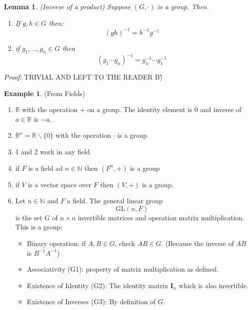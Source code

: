 \documentclass{report}
\newtheorem{lemma}[theorem]{Lemma}
\theoremstyle{remark}
\theoremstyle{definition}
\theoremstyle{definition}
\newtheorem{example}[theorem]{Example}
\theoremstyle{theorem}
\renewcommand{\v}[1]{\mathbf{#1}}
\begin{document}
\begin{lemma}
\emph{(Inverse of a product)} Suppose $(G,\cdot)$ is a group. Then
\begin{enumerate}[label=\textcircled{\tiny{\arabic*}}]
    \item If $g,h \in G$ then:
    \[(gh)^{-1}=h^{-1}g^{-1}\]
    \item if $g_1, ..., g_n \in G$ then
    \[(g_1 \cdots g_n)^{-1}=g_n^{-1}\cdots g_1^{-1}\]
\end{enumerate}
\end{lemma}
\emph{Proof:} TRIVIAL AND LEFT TO THE READER B\^)
\begin{example}
(From Fields)
\begin{enumerate}[label=\textcircled{\tiny{\arabic*}}]
    \item $\mathbb{R}$ with the operation + on a group. The identity element is 0 and inverse of $a \in \mathbb{R}$ is $-a$.
    \item $\mathbb{R}^x = \mathbb{R} \backslash \{0\}$ with the operation $\cdot$ is a group
    \item \textcircled{\tiny{1}} and \textcircled{\tiny{2}} work in any field
    \item if $F$ is a field ad $n \in \mathbb{N}$ then $(F^n, +)$ is a group
    \item if $V$ is a vector space over $F$ then $(V,+)$ is a group.
    \item Let $n \in \mathbb{N}$ and $F$ a field. The general linear group
    \[\text{GL}(n,F)\]
    is the set $G$ of $n \times n$ invertible matrices and operation matrix multiplication. This is a group:
    \begin{itemize}
        \item Binary operation: if $A,B \in G$, check $AB \in G$. (Because the inverse of $AB$ is $B^{-1}A^{-1}$)
        \item Associativity (G1): property of matrix multiplication as defined.
        \item Existence of Identity (G2): The identity matrix $\v{I}_n$ which is also invertible.
        \item Existence of Inverses (G3): By definition of $G$.
    \end{itemize}
\end{enumerate}
\end{example}
\end{document}
